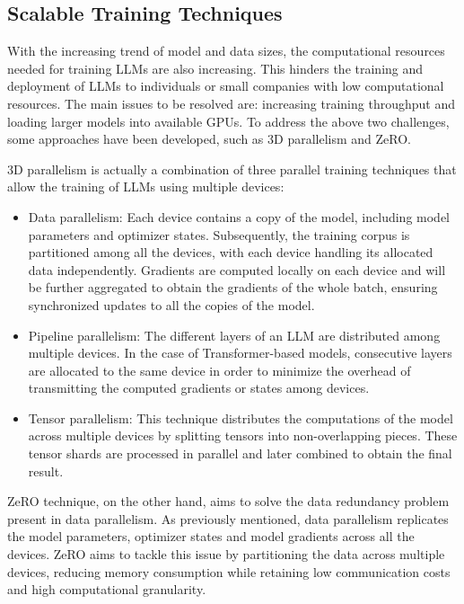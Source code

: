 \documentclass[11pt,english,listoffigures,listoftables]{tfgetsinf}
\begin{document}
\subsection{Scalable Training Techniques}

With the increasing trend of model and data sizes, the computational resources needed for training LLMs are also increasing. This hinders the training and deployment of LLMs to individuals or small companies with low computational resources. The main issues to be resolved are: increasing training throughput and loading larger models into available GPUs. To address the above two challenges, some approaches have been developed, such as 3D parallelism and ZeRO.

3D parallelism is actually a combination of three parallel training techniques that allow the training of LLMs using multiple devices:

\begin{itemize}
    \item Data parallelism: Each device contains a copy of the model, including model parameters and optimizer states. Subsequently, the training corpus is partitioned among all the devices, with each device handling its allocated data independently. Gradients are computed locally on each device and will be further aggregated to obtain the gradients of the whole batch, ensuring synchronized updates to all the copies of the model.
    

    \item Pipeline parallelism: The different layers of an LLM are distributed among multiple devices. In the case of Transformer-based models, consecutive layers are allocated to the same device in order to minimize the overhead of transmitting the computed gradients or states among devices.

    \item Tensor parallelism: This technique distributes the computations of the model across multiple devices by splitting tensors into non-overlapping pieces. These tensor shards are processed in parallel and later combined to obtain the final result.
\end{itemize}

ZeRO \cite{rajbhandari2020zero} technique, on the other hand, aims to solve the data redundancy problem present in data parallelism. As previously mentioned, data parallelism replicates the model parameters, optimizer states and model gradients across all the devices. ZeRO aims to tackle this issue by partitioning the data across multiple devices, reducing memory consumption while retaining low communication costs and high computational granularity.
 
\end{document}
